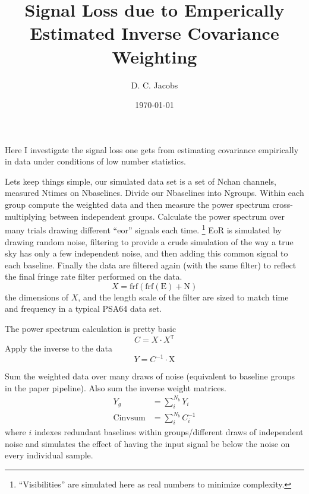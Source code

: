 \documentclass{article}
\begin{document}
\author{D. C. Jacobs}
\title{Signal Loss due to Emperically Estimated Inverse Covariance Weighting}

\date{\today}
\maketitle	

Here I investigate the signal loss one gets from estimating covariance empirically in data under conditions of low number statistics.

Lets keep things simple, our simulated data set is a set of Nchan channels, measured Ntimes on Nbaselines.   Divide our Nbaselines into Ngroups. Within each group compute the weighted data and then measure the power spectrum cross-multiplying between independent groups.  Calculate the power spectrum over many trials drawing different ``eor'' signals each time.  \footnote{``Visibilities'' are simulated here as real numbers to minimize complexity.}  EoR is simulated by drawing random noise, filtering to provide a crude simulation of the way a true sky has only a few independent noise,  and then adding this common signal to each baseline.   Finally the data are filtered again (with the same filter) to reflect the final fringe rate filter performed on the data.
\begin{equation}
X = \textrm{frf}(\textrm{frf}(\textrm{E}) + \textrm{N})
\end{equation}
the dimensions of $X$, and the length scale of the filter are sized to match time and frequency in a typical PSA64 data set.


The power spectrum calculation is pretty basic
\begin{equation}
C = X\cdot X^\mathsf{T}
\end{equation}
Apply the inverse to the data
\begin{equation}
Y = C^{-1}\cdot \textrm{X}
\end{equation}

Sum the weighted data over many draws of noise (equivalent to baseline groups in the paper pipeline). Also sum the inverse weight matrices.
\begin{align}
Y_g &= \sum_i^{N_b} Y_i\\
\textrm{Cinvsum} &= \sum_i^{N_b} C_i^{-1}
\end{align}
where $i$ indexes redundant baselines within groups/different draws of independent noise and simulates the effect of having the input signal be below the noise on every individual sample.
\end{document}
